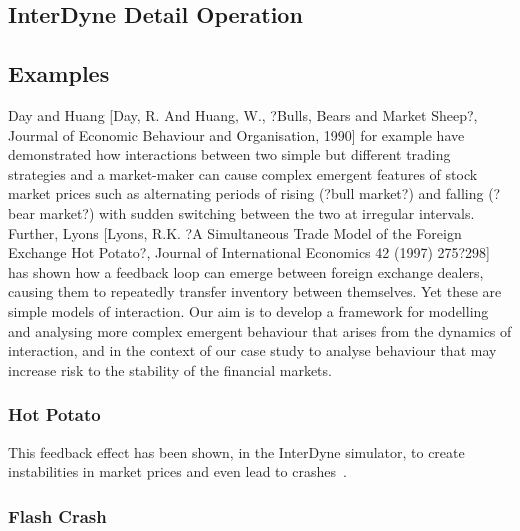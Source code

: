 \documentclass{article}
\begin{document}
\subsection{InterDyne Detail Operation}

\subsection{Examples}


Day and Huang [Day, R. And Huang, W., ?Bulls, Bears and Market Sheep?, Jourmal of Economic Behaviour and Organisation, 1990] for example have demonstrated how interactions between two simple but different trading strategies and a market-maker can cause complex emergent features of stock market prices such as alternating periods of rising (?bull market?) and falling (?bear market?) with sudden switching between the two at irregular intervals. Further, Lyons [Lyons, R.K. ?A Simultaneous Trade Model of the Foreign Exchange Hot Potato?, Journal of International Economics 42 (1997) 275?298] has shown how a feedback loop can emerge between foreign exchange dealers, causing them to repeatedly transfer inventory between themselves.  Yet these are simple models of interaction.  Our aim is to develop a framework for modelling and analysing more complex emergent behaviour that arises from the dynamics of interaction, and in the context of our case study to analyse behaviour that may increase risk to the stability of the financial markets.

\subsubsection{Hot Potato} 



This feedback effect has been shown, in the InterDyne simulator, to create instabilities in market prices and even lead to crashes~\cite{DynamicCoupling_Chris}.   






\subsubsection{Flash Crash}
 
\end{document}
